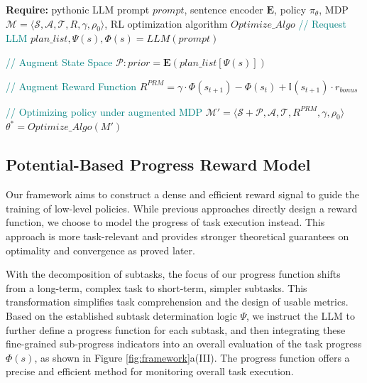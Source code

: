 \begin{algorithm}[t]
      \caption{PRM4RL}
      \begin{algorithmic}
      \State \textbf{Require:} pythonic LLM prompt $prompt$, sentence encoder $\mathbf{E}$, policy $\pi_\theta $, MDP \( \mathcal{M} = \langle \mathcal{S}, \mathcal{A}, \mathcal{T}, R, \gamma, \rho_0 \rangle \), RL optimization algorithm $Optimize\_Algo$
        \State \textcolor{teal}{// Request LLM}
        \State $plan\_list, \Psi(s), \Phi(s) = LLM(prompt)$

        \State \textcolor{teal}{// Augment State Space}
        \State $\mathcal{P}: prior = \mathbf{E}(plan\_list[\Psi(s)])$

        \State \textcolor{teal}{// Augment Reward Function}
        \State $R^{PRM} = \gamma \cdot \Phi(s_{t+1}) - \Phi(s_{t}) + \mathbb{I}(s_{t+1})\cdot r_{bonus}$

        \State \textcolor{teal}{// Optimizing policy under augmented MDP}
        \State $\mathcal{M'} = \langle \mathcal{S}+\mathcal{P}, \mathcal{A}, \mathcal{T}, R^{PRM}, \gamma, \rho_0 \rangle$
        \State $\theta^* = Optimize\_Algo(M')$
      \end{algorithmic}
\end{algorithm}

\subsection{Potential-Based Progress Reward Model}\label{sec:progress-reward}
Our framework aims to construct a dense and efficient reward signal to guide the training of low-level policies.
While previous approaches\cite{xie2024text2reward, ma2023eureka, hazra2024revolve} directly design a reward function, we choose to model the progress of task execution instead. This approach is more task-relevant and provides stronger theoretical guarantees on optimality and convergence as proved later.

With the decomposition of subtasks, the focus of our progress function shifts from a long-term, complex task to short-term, simpler subtasks.
This transformation simplifies task comprehension and the design of usable metrics.
Based on the established subtask determination logic $\Psi$, we instruct the LLM to further define a progress function for each subtask, and then integrating these fine-grained sub-progress indicators into an overall evaluation of the task progress $\Phi(s)$, as shown in Figure \ref{fig:framework}a(III).
The progress function offers a precise and efficient method for monitoring overall task execution.

